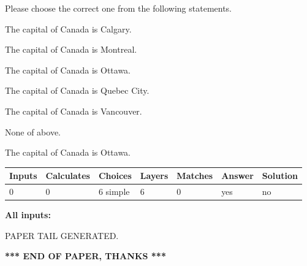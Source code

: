 \documentclass[12pt]{article}
\begin{document}
  
Please choose the correct one from the following statements.
 
 
The capital of Canada is Calgary.
 
 
The capital of Canada is Montreal.
 
 
The capital of Canada is Ottawa.
 
 
The capital of Canada is Quebec City.
 
 
The capital of Canada is Vancouver.
 
 
 None of above.
 
 
\noindent{}
 
 
The capital of Canada is Ottawa.
 
 
\noindent{}
 
 
   
   
   
   
\noindent\begin{tabular}{|l|l|l|l|l|l|l|}
 \hline
Inputs & Calculates & Choices & Layers & Matches & Answer & Solution \\ \hline
 0  & 
 0  & 
 6
  simple  
  & 
 6  & 
 0  & 
  yes & 
  no 
  \\ \hline
 \end{tabular}
   
   
   
   
\noindent{}
   
   
   
   
\noindent\vspace{0.1in}\hspace{-0.08in} {\textbf{\Large{All inputs: }}}
   
   
   
   
   
   
 \vspace{0.2in}
 
   
   
\vspace{2.0in} PAPER TAIL GENERATED.
   
   
   
   
\vspace{1.0in} 
{\textbf{\large{ *** END OF PAPER, THANKS *** }}} 
   
\end{document}
